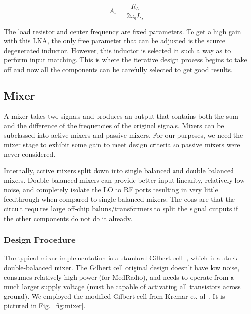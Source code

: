 \begin{equation} 
  	A_{v} = \frac{R_L}{2\omega_0L_s}
\end{equation}

The load resistor and center frequency are fixed parameters. To get a high gain with this LNA, the only free parameter that can be adjusted is the source degenerated inductor. However, this inductor is selected in such a way as to perform input matching. This is where the iterative design process begins to take off and now all the components can be carefully selected to get good results.

\subsection{Mixer}

A mixer takes two signals and produces an output that contains both the sum and the difference of the frequencies of the original signals. Mixers can be subclassed into active mixers and passive mixers. For our purposes, we need the mixer stage to exhibit some gain to meet design criteria so passive mixers were never considered. 

Internally, active mixers split down into single balanced and double balanced mixers. Double-balanced mixers can provide better input linearity, relatively low noise, and completely isolate the LO to RF ports resulting in very little feedthrough when compared to single balanced mixers. The cons are that the circuit requires large off-chip baluns/transformers to split the signal outputs if the other components do not do it already. 

\subsubsection{Design Procedure}
The typical mixer implementation is a standard Gilbert cell~\cite{gilbert}, which is a stock double-balanced mixer. The Gilbert cell original design doesn't have low noise, consumes relatively high power (for MedRadio), and needs to operate from a much larger supply voltage (must be capable of activating all transistors across ground). We employed the modified Gilbert cell from Krcmar et. al~\cite{krcmar1}. It is pictured in Fig.~\ref{fig:mixer}. 


